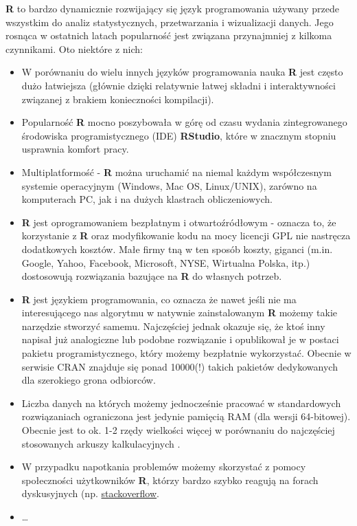 \documentclass[]{book}
\theoremstyle{definition}
\theoremstyle{definition}
\theoremstyle{definition}
\theoremstyle{remark}
\begin{document}
\textbf{R} to bardzo dynamicznie rozwijający się język programowania
używany przede wszystkim do analiz statystycznych, przetwarzania i
wizualizacji danych. Jego rosnąca w ostatnich latach popularność jest
związana przynajmniej z kilkoma czynnikami. Oto niektóre z nich:

\begin{itemize}
\item
  W porównaniu do wielu innych języków programowania nauka \textbf{R}
  jest często dużo łatwiejsza (głównie dzięki relatywnie łatwej składni
  i interaktywności związanej z brakiem konieczności kompilacji).
\item
  Popularność \textbf{R} mocno poszybowała w górę od czasu wydania
  zintegrowanego środowiska programistycznego (IDE) \textbf{RStudio},
  które w znacznym stopniu usprawnia komfort pracy.
\item
  Multiplatformość - \textbf{R} można uruchamić na niemal każdym
  współczesnym systemie operacyjnym (Windows, Mac OS, Linux/UNIX),
  zarówno na komputerach PC, jak i na dużych klastrach obliczeniowych.
\item
  \textbf{R} jest oprogramowaniem bezpłatnym i otwartoźródłowym -
  oznacza to, że korzystanie z \textbf{R} oraz modyfikowanie kodu na
  mocy licencji GPL nie nastręcza dodatkowych kosztów. Małe firmy tną w
  ten sposób koszty, giganci (m.in. Google, Yahoo, Facebook, Microsoft,
  NYSE, Wirtualna Polska, itp.) dostosowują rozwiązania bazujące na
  \textbf{R} do własnych potrzeb.
\item
  \textbf{R} jest językiem programowania, co oznacza że nawet jeśli nie
  ma interesującego nas algorytmu w natywnie zainstalowanym \textbf{R}
  możemy takie narzędzie stworzyć samemu. Najczęściej jednak okazuje
  się, że ktoś inny napisał już analogiczne lub podobne rozwiązanie i
  opublikował je w postaci pakietu programistycznego, który możemy
  bezpłatnie wykorzystać. Obecnie w serwisie CRAN znajduje się ponad
  10000(!) takich pakietów dedykowanych dla szerokiego grona odbiorców.
\item
  Liczba danych na których możemy jednocześnie pracować w standardowych
  rozwiązaniach ograniczona jest jedynie pamięcią RAM (dla wersji
  64-bitowej). Obecnie jest to ok. 1-2 rzędy wielkości więcej w
  porównaniu do najczęściej stosowanych arkuszy kalkulacyjnych
  \citep{excel2016}.
\item
  W przypadku napotkania problemów możemy skorzystać z pomocy
  społeczności użytkowników \textbf{R}, którzy bardzo szybko reagują na
  forach dyskusyjnych (np.
  \href{http://stackoverflow.com/}{stackoverflow}.
\item
  \ldots{}
\end{itemize}
\end{document}
